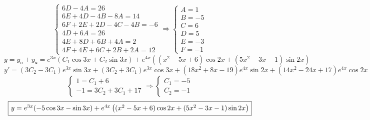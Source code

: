 \documentclass[a3paper,14pt]{extarticle}
\newcommand*\squared[1]{\tikz[baseline=(char.base)]{
            \node[shape=rectangle,draw,inner sep=4pt] (char) {#1};}}
\begin{document}
$$\begin{cases}
    6D - 4A = 26 \\ 6E+4D-4B-8A = 14 \\ 6F + 2E + 2D - 4C - 4B = -6 \\ 4D+6A = 26 \\ 4E + 8D + 6B + 4A = 2 \\ 4F+4E+6C+2B+2A = 12
\end{cases} \Rightarrow \begin{cases}
    A = 1 \\ B = -5 \\ C = 6 \\ D = 5 \\ E = -3 \\ F = -1
\end{cases}$$
$$y = y_o+y_{\text{ч}} = e^{3x}(C_1\cos{3x}+C_2\sin{3x}) + e^{4x}\left( (x^2-5x+6)\cos{2x}+(5x^2-3x-1)\sin{2x} \right)$$
$$y' = \left(3C_{2}-3C_{1}\right){e}^{3x}\sin{3x}+\left(3C_{2}+3C_{1}\right){e}^{3x}\cos{3x}+\left(18{x}^{2}+8x-19\right){e}^{4x}\sin{2x}+\left(14{x}^{2}-24x+17\right){e}^{4x}\cos{2x}$$
$$\begin{cases}
    1= C_1 + 6 \\ -1 = 3C_{2}+3C_{1}+17
\end{cases} \Rightarrow \begin{cases}
    C_1 = -5 \\ C_2 = -1
\end{cases}$$
$$\squared{$y = e^{3x}(-5\cos{3x}-\sin{3x}) + e^{4x}\left( (x^2-5x+6)\cos{2x}+(5x^2-3x-1)\sin{2x} \right)$}$$
\end{document}
